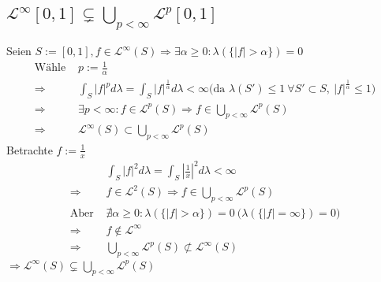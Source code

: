 \documentclass[12pt,a4paper]{article}
\begin{document}
\subsection*{$\mathscr{L}^{\infty}[0,1] \subsetneq \bigcup_{p < \infty}\mathscr{L}^{p}[0,1]$}
Seien $S:= [0,1], f \in \mathscr{L}^\infty(S)\Rightarrow \exists \alpha \geq 0: \lambda(\{|f| > \alpha \})=0$
\begin{align*}
	\text{Wähle } & p := \frac{1}{\alpha}\\
	\Rightarrow&\int_S |f|^p d\lambda = \int_S \left\lvert f \right\lvert^{\frac{1}{\alpha}}d\lambda < \infty	\big( \text{da } \lambda(S') \leq 1 \ \forall S' \subset S , \ \left\lvert f \right\lvert^{\frac{1}{\alpha}} \leq 1 \big)\\
	\Rightarrow &\exists p < \infty : f \in \mathscr{L}^p(S) \Rightarrow f \in \bigcup_{p < \infty} \mathscr{L}^p(S)\\
	\Rightarrow &\mathscr{L}^\infty(S) \subset \bigcup_{p < \infty} \mathscr{L}^p(S)
\end{align*}
Betrachte $f := \frac{1}{x}$
\begin{align*}
&\int_S	\left\lvert f\right\lvert^2 d\lambda = \int_S	\left\lvert \frac{1}{x}\right\lvert^2 d\lambda < \infty\\
\Rightarrow &f \in \mathscr{L}^2(S) \Rightarrow f \in \bigcup_{p<\infty} \mathscr{L}^p(S)\\
\text{Aber } & \nexists \alpha \geq 0: \lambda(\{|f|>\alpha\}) = 0 \ \big(\lambda(\{|f|=\infty\} )=0\big)\\
\Rightarrow& f \notin \mathscr{L}^\infty\\
\Rightarrow& \bigcup_{p<\infty}\mathscr{L}^p(S)
\not\subset \mathscr{L}^\infty(S)
\end{align*}
$\Rightarrow \mathscr{L}^{\infty}(S) \subsetneq \bigcup_{p < \infty}\mathscr{L}^{p}(S)$
\end{document}
